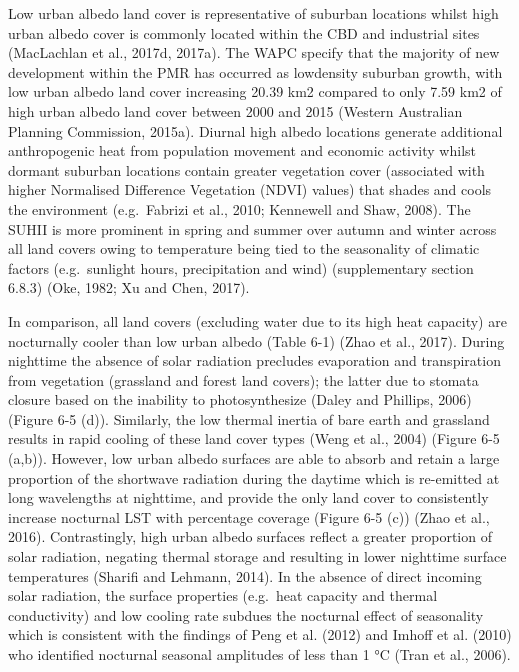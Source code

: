 \documentclass[]{book}
\begin{document}
Low urban albedo land cover is representative of suburban locations
whilst high urban albedo cover is commonly located within the CBD and
industrial sites (MacLachlan et al., 2017d, 2017a). The WAPC specify
that the majority of new development within the PMR has occurred as
lowdensity suburban growth, with low urban albedo land cover increasing
20.39 km2 compared to only 7.59 km2 of high urban albedo land cover
between 2000 and 2015 (Western Australian Planning Commission, 2015a).
Diurnal high albedo locations generate additional anthropogenic heat
from population movement and economic activity whilst dormant suburban
locations contain greater vegetation cover (associated with higher
Normalised Difference Vegetation (NDVI) values) that shades and cools
the environment (e.g.~Fabrizi et al., 2010; Kennewell and Shaw, 2008).
The SUHII is more prominent in spring and summer over autumn and winter
across all land covers owing to temperature being tied to the
seasonality of climatic factors (e.g.~sunlight hours, precipitation and
wind) (supplementary section 6.8.3) (Oke, 1982; Xu and Chen, 2017).

In comparison, all land covers (excluding water due to its high heat
capacity) are nocturnally cooler than low urban albedo (Table 6-1) (Zhao
et al., 2017). During nighttime the absence of solar radiation precludes
evaporation and transpiration from vegetation (grassland and forest land
covers); the latter due to stomata closure based on the inability to
photosynthesize (Daley and Phillips, 2006) (Figure 6-5 (d)). Similarly,
the low thermal inertia of bare earth and grassland results in rapid
cooling of these land cover types (Weng et al., 2004) (Figure 6-5
(a,b)). However, low urban albedo surfaces are able to absorb and retain
a large proportion of the shortwave radiation during the daytime which
is re-emitted at long wavelengths at nighttime, and provide the only
land cover to consistently increase nocturnal LST with percentage
coverage (Figure 6-5 (c)) (Zhao et al., 2016). Contrastingly, high urban
albedo surfaces reflect a greater proportion of solar radiation,
negating thermal storage and resulting in lower nighttime surface
temperatures (Sharifi and Lehmann, 2014). In the absence of direct
incoming solar radiation, the surface properties (e.g.~heat capacity and
thermal conductivity) and low cooling rate subdues the nocturnal effect
of seasonality which is consistent with the findings of Peng et al.
(2012) and Imhoff et al. (2010) who identified nocturnal seasonal
amplitudes of less than 1 °C (Tran et al., 2006).
\end{document}
